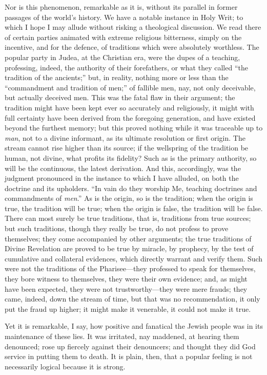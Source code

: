 Nor is this phenomenon, remarkable as it is, without
its parallel in former passages of the world's history.
We have a notable instance in Holy Writ; to which I hope
I may allude without risking a theological discussion. We
read there of certain parties animated with extreme
religious bitterness, simply on the incentive, and for
the defence, of traditions which were absolutely
worthless. The popular party in Judea, at the Christian
era, were the dupes of a teaching, professing, indeed,
the authority of their forefathers, or what they called
``the tradition of the ancients;'' but, in
reality, nothing more or less than the ``commandment
and tradition of men;'' of fallible men, nay, not
only deceivable, but actually deceived men. This was the
fatal flaw in their argument; the tradition might have
been kept ever so accurately and religiously, it might
with full certainty have been derived from the foregoing
generation, and have existed beyond the furthest memory;
but this proved nothing while it was traceable up to \emph{man},
not to a divine informant, as its ultimate resolution or
first origin. The stream cannot rise higher than its
source; if the wellspring of the tradition be human, not
divine, what profits its fidelity? Such as is the primary
authority, so will be the continuous, the latest
derivation. And this, accordingly, was the judgment
pronounced in the instance to which I have alluded, on
both the doctrine and its upholders. ``In vain do
they worship Me, teaching doctrines and commandments of \emph{men}.''
As is the origin, so is the tradition; when the origin is
true, the tradition will be true; when the origin is
false, the tradition will be false. There can most surely
be true traditions, that is, traditions from true
sources; but such traditions, though they really be true,
do not profess to prove themselves; they come accompanied
by other arguments; the true traditions of Divine
Revelation are proved to be true by miracle, by prophecy,
by the test of cumulative and collateral evidences, which
directly warrant and verify them. Such were not the
traditions of the Pharisee—they professed to speak
for themselves, they bore witness to themselves, they
were their own evidence; and, as might have been
expected, they were not trustworthy—they were mere
frauds; they came, indeed, down the stream of time, but
that was no recommendation, it only put the fraud up
higher; it might make it venerable, it could not make it
true.

Yet it is remarkable, I say, how positive and
fanatical the Jewish people was in its maintenance of
these lies. It was irritated, nay maddened, at hearing
them denounced; rose up fiercely against their
denouncers; and thought they did God service in putting
them to death. It is plain, then, that a popular feeling
is not necessarily logical because it is strong.

